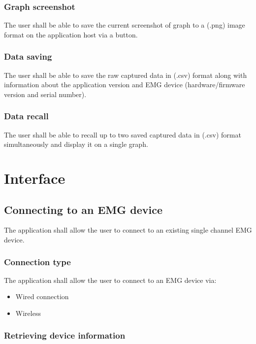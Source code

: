 \documentclass[12pt,a4paper]{article}
\begin{document}
\subsubsection{Graph screenshot}

The user shall be able to save the current screenshot of graph to a (.png) image format on the application host via a button.

\subsubsection{Data saving}

The user shall be able to save the raw captured data in (.csv) format along with information about the application version and EMG device (hardware/firmware version and serial number).

\subsubsection{Data recall}

The user shall be able to recall up to two saved captured data in (.csv) format simultaneously and display it on a single graph.

\newpage

\section{Interface}

\subsection{Connecting to an EMG device}

The application shall allow the user to connect to an existing single channel EMG device.

\subsubsection{Connection type}

The application shall allow the user to connect to an EMG device via:

\begin{itemize}
\item Wired connection
\item Wireless
\end{itemize}

\subsubsection{Retrieving device information}
\end{document}
